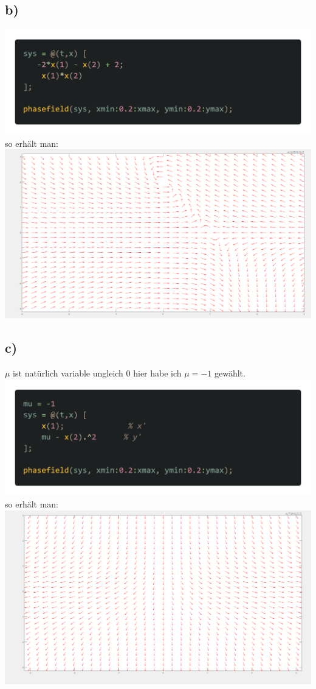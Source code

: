 \documentclass{scrartcl}
\begin{document}
\subsection*{b)}
\includegraphics[scale=0.3]{bPhasefieldinit.png}\\
so erhält man:\\
\includegraphics[scale=0.2]{bPhasefieldout.png}
\subsection*{c)}
$\mu$ ist natürlich variable ungleich 0 hier habe ich $\mu = -1$ gewählt.\\
\includegraphics[scale=0.3]{muPhasefieldinit.png}\\
so erhält man:\\
\includegraphics[scale=0.2]{muPhasefieldout.png}
\end{document}
